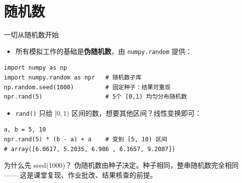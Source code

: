 \documentclass[9pt]{ctexbeamer}
\begin{document}
\section{随机数}

\begin{frame}[fragile]{一切从随机数开始}
	\begin{itemize}
		\item 所有模拟工作的基础是\textbf{伪随机数}，由 \texttt{numpy.random} 提供：
	\end{itemize}
\begin{lstlisting}
import numpy as np
import numpy.random as npr   # 随机数子库
np.random.seed(1000)         # 固定种子：结果可重现
npr.rand(5)                  # 5个 [0,1) 均匀分布随机数
\end{lstlisting}
	\begin{itemize}
		\item \texttt{rand()} 只给 $[0,1)$ 区间的数，想要其他区间？线性变换即可：
	\end{itemize}
\begin{lstlisting}
a, b = 5, 10
npr.rand(5) * (b - a) + a    # 变到 [5, 10) 区间
# array([6.0617, 5.2035, 6.986 , 6.1657, 9.2087])
\end{lstlisting}
	\begin{alertblock}{为什么先 seed(1000)？}
		伪随机数由种子决定。\alert{种子相同，整串随机数完全相同}——
		这是课堂复现、作业批改、结果核查的前提。
	\end{alertblock}
\end{frame}
\end{document}
